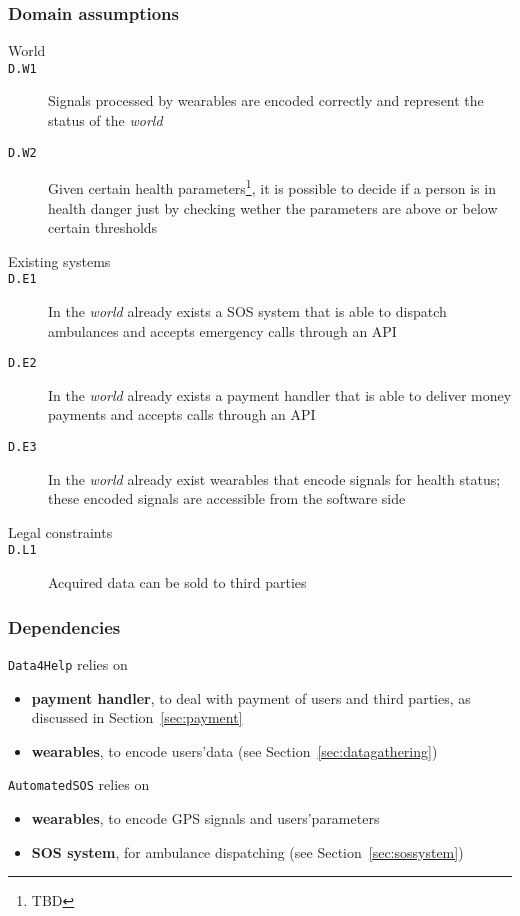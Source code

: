     \subsubsection{Domain assumptions}
    \label{sec:domainassumptions}

      \begin{description}
        \item[World]
        \item[\texttt{D.W1}] Signals processed by wearables are encoded correctly and represent the status of the \textit{world}
        \item[\texttt{D.W2}] Given certain health parameters\footnote{TBD
        }, it is possible to decide if a person is in health danger just by checking wether the parameters are above or below certain thresholds
        \item[Existing systems]
        \item[\texttt{D.E1}] In the \textit{world} already exists a SOS system that is able to dispatch ambulances and accepts emergency calls through an API
        \item[\texttt{D.E2}] In the \textit{world} already exists a payment handler that is able to deliver money payments and accepts calls through an API
        \item[\texttt{D.E3}] In the \textit{world} already exist wearables that encode signals for health status; these encoded signals are accessible from the software side
        \item[Legal constraints]
        \item[\texttt{D.L1}] Acquired data can be sold to third parties
      \end{description}

    \subsubsection{Dependencies}

      \texttt{Data4Help} relies on
      \begin{itemize}
        \item \textbf{payment handler}, to deal with payment of users and third parties, as discussed in Section~\ref{sec:payment}
        \item \textbf{wearables}, to encode users'data (see Section~\ref{sec:datagathering})
      \end{itemize}
      \texttt{AutomatedSOS} relies on
      \begin{itemize}
        \item \textbf{wearables}, to encode GPS signals and users'parameters
        \item \textbf{SOS system}, for ambulance dispatching (see Section~\ref{sec:sossystem})
      \end{itemize}

